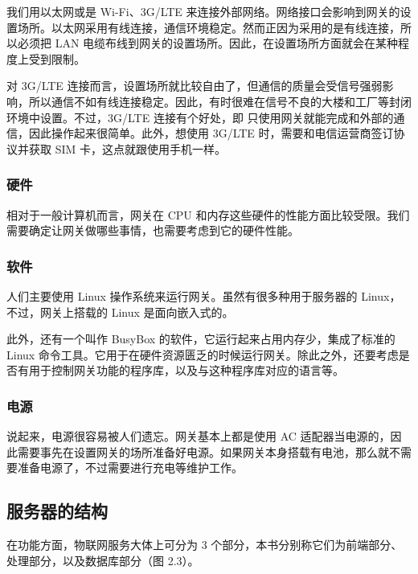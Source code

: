 \documentclass[12pt,UTF8]{ctexbook}
\begin{document}
我们用以太网或是 Wi-Fi、3G/LTE 来连接外部网络。网络接口会影响到网关的设置场所。以太网采用有线连接，通信环境稳定。然而正因为采用的是有线连接，所以必须把 LAN 电缆布线到网关的设置场所。因此，在设置场所方面就会在某种程度上受到限制。

对 3G/LTE 连接而言，设置场所就比较自由了，但通信的质量会受信号强弱影响，所以通信不如有线连接稳定。因此，有时很难在信号不良的大楼和工厂等封闭环境中设置。不过，3G/LTE 连接有个好处，即
只使用网关就能完成和外部的通信，因此操作起来很简单。此外，想使用 3G/LTE 时，需要和电信运营商签订协议并获取 SIM 卡，这点就跟使用手机一样。

\subsubsection{硬件}

相对于一般计算机而言，网关在 CPU 和内存这些硬件的性能方面比较受限。我们需要确定让网关做哪些事情，也需要考虑到它的硬件性能。

\subsubsection{软件}

人们主要使用 Linux 操作系统来运行网关。虽然有很多种用于服务器的 Linux，不过，网关上搭载的 Linux 是面向嵌入式的。

此外，还有一个叫作 BusyBox 的软件，它运行起来占用内存少，集成了标准的 Linux 命令工具。它用于在硬件资源匮乏的时候运行网关。除此之外，还要考虑是否有用于控制网关功能的程序库，以及与这种程序库对应的语言等。

\subsubsection{电源}

说起来，电源很容易被人们遗忘。网关基本上都是使用 AC 适配器当电源的，因此需要事先在设置网关的场所准备好电源。如果网关本身搭载有电池，那么就不需要准备电源了，不过需要进行充电等维护工作。

\subsection{服务器的结构}

在功能方面，物联网服务大体上可分为 3 个部分，本书分别称它们为前端部分、处理部分，以及数据库部分（图 2.3）。
\end{document}
